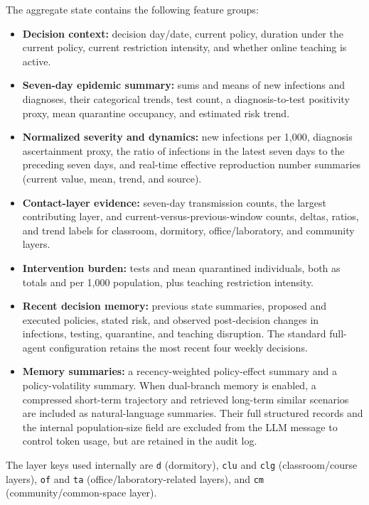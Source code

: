 The aggregate state contains the following feature groups:

\begin{itemize}
  \item \textbf{Decision context:} decision day/date, current policy, duration
  under the current policy, current restriction intensity, and whether online
  teaching is active.
  \item \textbf{Seven-day epidemic summary:} sums and means of new infections
  and diagnoses, their categorical trends, test count, a diagnosis-to-test
  positivity proxy, mean quarantine occupancy, and estimated risk trend.
  \item \textbf{Normalized severity and dynamics:} new infections per 1,000,
  diagnosis ascertainment proxy, the ratio of infections in the latest seven
  days to the preceding seven days, and real-time effective reproduction number
  summaries (current value, mean, trend, and source).
  \item \textbf{Contact-layer evidence:} seven-day transmission counts, the
  largest contributing layer, and current-versus-previous-window counts, deltas,
  ratios, and trend labels for classroom, dormitory, office/laboratory, and
  community layers.
  \item \textbf{Intervention burden:} tests and mean quarantined individuals,
  both as totals and per 1,000 population, plus teaching restriction intensity.
  \item \textbf{Recent decision memory:} previous state summaries, proposed and
  executed policies, stated risk, and observed post-decision changes in
  infections, testing, quarantine, and teaching disruption.  The standard
  full-agent configuration retains the most recent four weekly decisions.
  \item \textbf{Memory summaries:} a recency-weighted policy-effect summary and
  a policy-volatility summary.  When dual-branch memory is enabled, a compressed
  short-term trajectory and retrieved long-term similar scenarios are included
  as natural-language summaries.  Their full structured records and the
  internal population-size field are excluded from the LLM message to control
  token usage, but are retained in the audit log.
\end{itemize}

The layer keys used internally are \texttt{d} (dormitory), \texttt{clu} and
\texttt{clg} (classroom/course layers), \texttt{of} and \texttt{ta}
(office/laboratory-related layers), and \texttt{cm} (community/common-space
layer).

